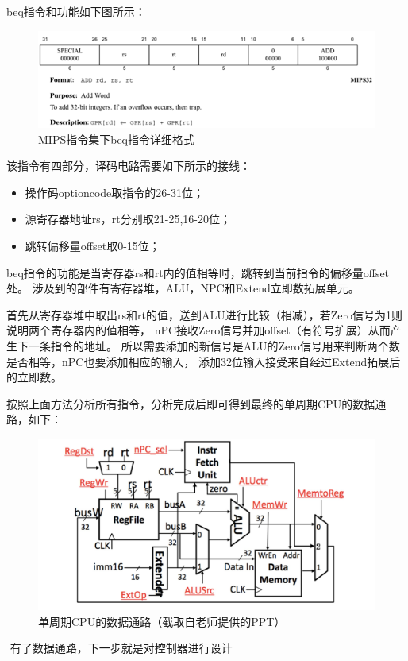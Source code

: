 \documentclass[UTF8]{article}
\begin{document}
   
beq指令和功能如下图所示：
​​\begin{figure}[H]
    \centering
    \includegraphics[width=\linewidth]{1.png}       
    \caption{MIPS指令集下beq指令详细格式}
    \label{FIG2}
\end{figure}

该指令有四部分，译码电路需要如下所示的接线：
\begin{itemize}
\item 操作码optioncode取指令的26-31位；
\item 源寄存器地址rs，rt分别取21-25,16-20位；
\item 跳转偏移量offset取0-15位；
\end{itemize}

beq指令的功能是当寄存器rs和rt内的值相等时，跳转到当前指令的偏移量offset处。
涉及到的部件有寄存器堆，ALU，NPC和Extend立即数拓展单元。

首先从寄存器堆中取出rs和rt的值，送到ALU进行比较（相减），若Zero信号为1则说明两个寄存器内的值相等，
nPC接收Zero信号并加offset（有符号扩展）从而产生下一条指令的地址。
所以需要添加的新信号是ALU的Zero信号用来判断两个数是否相等，nPC也要添加相应的输入，
添加32位输入接受来自经过Extend拓展后的立即数。

按照上面方法分析所有指令，分析完成后即可得到最终的单周期CPU的数据通路，如下：

\begin{figure}[H]
    \centering
    \includegraphics[width=\linewidth]{2.png}
    \caption{单周期CPU的数据通路（截取自老师提供的PPT）}
    \label{FIG3}
\end{figure}
​​
有了数据通路，下一步就是对控制器进行设计
\end{document}
